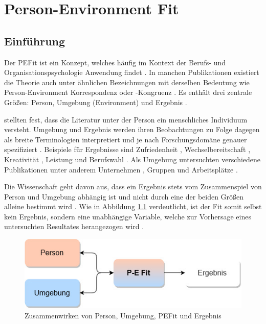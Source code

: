 \chapter{Person-Environment Fit}
\label{ch:personEnvironmentFit}

\section{Einführung}
\label{ch:personEnvironmentFit:einfuehrung}
Der \acf{PEFit} ist ein Konzept, welches häufig im Kontext der Berufs- und Organisationspsychologie Anwendung findet \cite[S. 2]{guan:2021}. In manchen Publikationen existiert die Theorie auch unter ähnlichen Bezeichnungen mit derselben Bedeutung wie Person-Environment Korrespondenz \cite[S. 1]{eggerth:2008} oder -Kongruenz \cite[S. 1]{muchinsky:1987}\cite[S. 53]{edwards:2008}\cite[S. 3]{edwards:2007}. Es enthält drei zentrale Größen: Person, Umgebung (Environment) und Ergebnis \cite[S. 2]{livingstone:1997}.

\textcite[S. 5]{edwards:2007} stellten fest, dass die Literatur unter der Person ein menschliches Individuum versteht. Umgebung und Ergebnis werden ihren Beobachtungen zu Folge dagegen als breite Terminologien interpretiert und je nach Forschungsdomäne genauer spezifiziert \cite[S. 1ff.]{edwards:2007}. Beispiele für Ergebnisse sind Zufriedenheit \cite[S. 1]{lashani:2021}, Wechselbereitschaft \cite[S. 1]{amarneh:2021}, Kreativität \cite[S. 1]{duan:2019}, Leistung \cite[S. 6ff.]{elfenbein:2007} und  Berufswahl \cite[S. 1]{cable:1996}\cite[S. 1]{edwards:2007}. Als Umgebung untersuchten verschiedene Publikationen unter anderem Unternehmen \cite[S. 1]{kristof:1996}, Gruppen \cite[S. 1]{werbel:2001} und Arbeitsplätze \cite[S. 1]{lu:2014}\cite[S. 5]{edwards:2007}.

Die Wissenschaft geht davon aus, dass ein Ergebnis stets vom Zusammenspiel von Person und Umgebung abhängig ist und nicht durch eine der beiden Größen alleine bestimmt wird \cite[S. 1f.]{muchinsky:1987}. Wie in Abbildung \ref{fig:personEnvironmentFit:einfuehrung:abb1} verdeutlicht, ist der Fit somit selbst kein Ergebnis, sondern eine unabhängige Variable, welche zur Vorhersage eines untersuchten Resultates herangezogen wird \cite[S. 11]{caplan:1993}\cite[S.5]{edwards:1991}\cite[S. 1]{edwards:2002}.

\begin{figure}[h]
	\centering
	\includegraphics[width=1\textwidth]{gfx/P-E Fit.jpg}
	\caption{Zusammenwirken von Person, Umgebung, \acs{PEFit} und Ergebnis}
	\label{fig:personEnvironmentFit:einfuehrung:abb1}
\end{figure}

